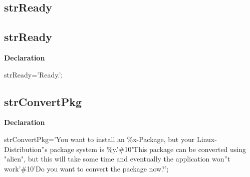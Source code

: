 \documentclass{report}
\newif\ifpdf
\begin{document}
\subsection*{\large{\textbf{strReady}}\normalsize\hspace{1ex}\hrulefill}
\else
\subsection*{strReady}
\fi
\label{trstrings-strReady}
\begin{list}{}{
\setlength{\itemindent}{0cm}
\setlength{\listparindent}{0cm}
\setlength{\leftmargin}{\evensidemargin}
\addtolength{\leftmargin}{\tmplength}
\settowidth{\labelsep}{X}
\addtolength{\leftmargin}{\labelsep}
\setlength{\labelwidth}{\tmplength}
}
\item[\textbf{Declaration}\hfill]
\ifpdf
\begin{flushleft}
\fi
\begin{ttfamily}
strReady='Ready.';\end{ttfamily}

\ifpdf
\end{flushleft}
\fi

\end{list}
\ifpdf
\subsection*{\large{\textbf{strConvertPkg}}\normalsize\hspace{1ex}\hrulefill}
\else
\subsection*{strConvertPkg}
\fi
\label{trstrings-strConvertPkg}
\begin{list}{}{
\setlength{\itemindent}{0cm}
\setlength{\listparindent}{0cm}
\setlength{\leftmargin}{\evensidemargin}
\addtolength{\leftmargin}{\tmplength}
\settowidth{\labelsep}{X}
\addtolength{\leftmargin}{\labelsep}
\setlength{\labelwidth}{\tmplength}
}
\item[\textbf{Declaration}\hfill]
\ifpdf
\begin{flushleft}
\fi
\begin{ttfamily}
strConvertPkg='You want to install an {\%}x-Package, but your Linux-Distribution''s package system is {\%}y.'{\#}10'This package can be converted using "alien", but this will take some time and eventually the application won''t work'{\#}10'Do you want to convert the package now?';\end{ttfamily}

\ifpdf
\end{flushleft}
\fi

\end{list}
\ifpdf
\end{document}
